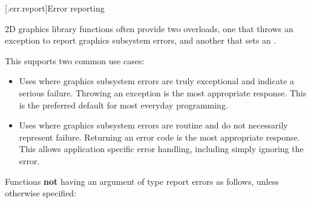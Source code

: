 [\iotwod.err.report]{Error reporting}

\pnum
2D graphics library functions often provide two overloads, one that throws an exception to report graphics subsystem errors, and another that sets an .

\pnum
\begin{note}
This supports two common use cases:

\begin{itemize}
\item Uses where graphics subsystem errors are truly exceptional and indicate a serious failure. Throwing an exception is the most appropriate response. This is the preferred default for most everyday programming.

\item Uses where graphics subsystem errors are routine and do not necessarily represent failure. Returning an error code is the most appropriate response. This allows application specific error handling, including simply ignoring the error.
\end{itemize}

\end{note}

\pnum
Functions \textbf{not} having an argument of type  report errors as follows, unless otherwise specified:


